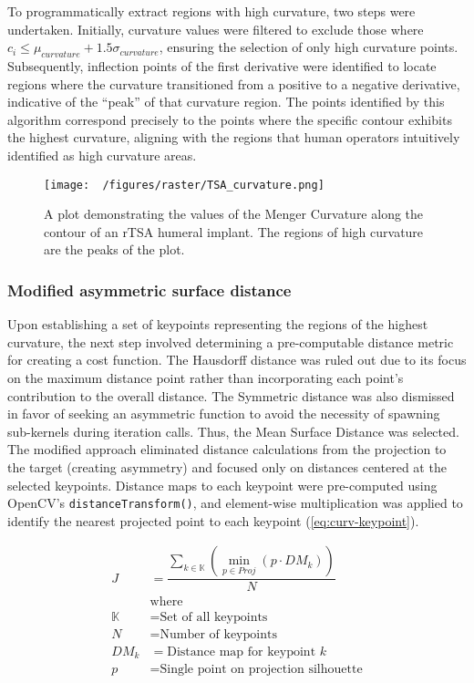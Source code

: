To programmatically extract regions with high curvature, two steps were undertaken.
Initially, curvature values were filtered to exclude those where $c_{i} \le \mu_{curvature} + 1.5\sigma_{curvature}$, ensuring the selection of only high curvature points.
Subsequently, inflection points of the first derivative were identified to locate regions where the curvature transitioned from a positive to a negative derivative, indicative of the ``peak'' of that curvature region.
The points identified by this algorithm correspond precisely to the points where the specific contour exhibits the highest curvature, aligning with the regions that human operators intuitively identified as high curvature areas.


\begin{figure}[h!]
  \centering
  \texttt{[image: ~/figures/raster/TSA\_curvature.png]}
  \caption{A plot demonstrating the values of the Menger Curvature along the contour of an rTSA humeral implant. The regions of high curvature are the peaks of the plot.}
  \label{fig:tsa-curv}
\end{figure}



\subsubsection{Modified asymmetric surface distance}
Upon establishing a set of keypoints representing the regions of the highest curvature, the next step involved determining a pre-computable distance metric for creating a cost function.
The Hausdorff distance was ruled out due to its focus on the maximum distance point rather than incorporating each point's contribution to the overall distance.
The Symmetric distance was also dismissed in favor of seeking an asymmetric function to avoid the necessity of spawning sub-kernels during iteration calls.
Thus, the Mean Surface Distance was selected.
The modified approach eliminated distance calculations from the projection to the target (creating asymmetry) and focused only on distances centered at the selected keypoints.
Distance maps to each keypoint were pre-computed using OpenCV's \texttt{distanceTransform()}, and element-wise multiplication was applied to identify the nearest projected point to each keypoint (\cref{eq:curv-keypoint}).

\begin{equation}
  \label{eq:curv-keypoint}
  \begin{split}
    \displaystyle J &= \dfrac{\sum_{k \in \mathbb{K}}(\min_{p\in Proj}(p \cdot DM_{k}))}{N} \\
      &\text{where}\\
    \mathbb{K} &= \text{Set of all keypoints} \\
    N &= \text{Number of keypoints} \\
    DM_{k} &= \text{Distance map for keypoint $k$} \\
    p &= \text{Single point on projection silhouette}
  \end{split}
\end{equation}

